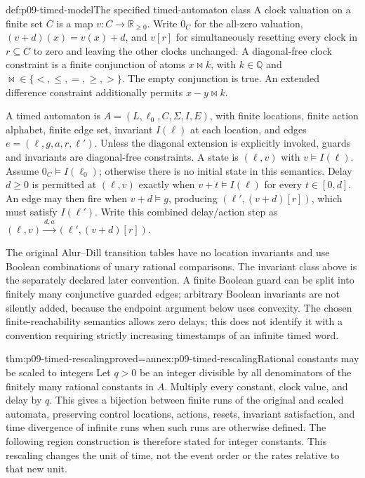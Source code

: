 \begin{hbdefinition}{def:p09-timed-model}{The specified timed-automaton class}
A clock valuation on a finite set \(C\) is a map
\(v:C\to\mathbb R_{\geq0}\). Write \(0_C\) for the all-zero valuation,
\((v+d)(x)=v(x)+d\), and \(v[r]\) for simultaneously resetting every
clock in \(r\subseteq C\) to zero and leaving the other clocks unchanged.
A diagonal-free clock constraint is a finite conjunction of atoms
\(x\bowtie k\), with \(k\in\mathbb Q\) and
\(\bowtie\in\{<,\leq,=,\geq,>\}\). The empty conjunction is true.
An extended difference constraint additionally permits \(x-y\bowtie k\).

A timed automaton is \(A=(L,\ell_0,C,\Sigma,I,E)\), with finite locations,
finite action alphabet, finite edge set, invariant \(I(\ell)\) at each
location, and edges \(e=(\ell,g,a,r,\ell')\). Unless the diagonal extension
is explicitly invoked, guards and invariants are diagonal-free constraints.
A state is \((\ell,v)\) with \(v\models I(\ell)\). Assume
\(0_C\models I(\ell_0)\); otherwise there is no initial state in this
semantics. Delay \(d\geq0\) is permitted at \((\ell,v)\) exactly when
\(v+t\models I(\ell)\) for every \(t\in[0,d]\). An edge may then fire
when \(v+d\models g\), producing \((\ell',(v+d)[r])\), which must satisfy
\(I(\ell')\). Write this combined delay/action step as
\((\ell,v)\xrightarrow{d,a}(\ell',(v+d)[r])\).

The original Alur--Dill transition tables have no location invariants and
use Boolean combinations of unary rational comparisons. The invariant
class above is the separately declared later convention. A finite Boolean
guard can be split into finitely many conjunctive guarded edges; arbitrary
Boolean invariants are not silently added, because the endpoint argument
below uses convexity. The chosen finite-reachability semantics allows zero
delays; this does not identify it with a convention requiring strictly
increasing timestamps of an infinite timed word.
\end{hbdefinition}

\begin{hblemma}{thm:p09-timed-rescaling}{proved=annex:p09-timed-rescaling}{Rational constants may be scaled to integers}
Let \(q>0\) be an integer divisible by all denominators of the finitely
many rational constants in \(A\). Multiply every constant, clock value,
and delay by \(q\). This gives a bijection between finite runs of the
original and scaled automata, preserving control locations, actions,
resets, invariant satisfaction, and time divergence of infinite runs when
such runs are otherwise defined. The following region construction is
therefore stated for integer constants. This rescaling changes the unit of
time, not the event order or the rates relative to that new unit.
\end{hblemma}

